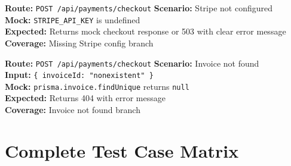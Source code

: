 ﻿\documentclass[12pt,a4paper]{report}
\newcommand{\ptwo}{\textbf{\color{p2orange}P2}}
\begin{document}
\begin{tcolorbox}[testbox,title={STRIPE-004 \hfill \ptwo}]
\textbf{Route:} \texttt{POST /api/payments/checkout} \quad \textbf{Scenario:} Stripe not configured \\
\textbf{Mock:} \texttt{STRIPE\_API\_KEY} is undefined \\
\textbf{Expected:} Returns mock checkout response or 503 with clear error message \\
\textbf{Coverage:} Missing Stripe config branch
\end{tcolorbox}

\begin{tcolorbox}[testbox,title={STRIPE-005 \hfill \ptwo}]
\textbf{Route:} \texttt{POST /api/payments/checkout} \quad \textbf{Scenario:} Invoice not found \\
\textbf{Input:} \texttt{\{ invoiceId: "nonexistent" \}} \\
\textbf{Mock:} \texttt{prisma.invoice.findUnique} returns \texttt{null} \\
\textbf{Expected:} Returns 404 with error message \\
\textbf{Coverage:} Invoice not found branch
\end{tcolorbox}

\section{Complete Test Case Matrix}
\end{document}
